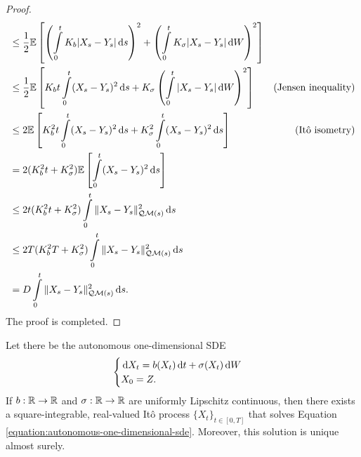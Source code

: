 \begin{proof}
\begin{align*}
     & \le \dfrac{1}{2}\mathbb{E}\left[\left(\int\limits_0^t K_b|X_s-Y_s|\,\mathrm{d} s\right)^2+\left(\int\limits_0^t K_\sigma|X_s-Y_s|\,\mathrm{d} W\right)^2\right]                         \\
     & \le \dfrac{1}{2}\mathbb{E}\left[K_b t\int\limits_0^t (X_s-Y_s)^2\,\mathrm{d} s+K_\sigma\left(\int\limits_0^t |X_s-Y_s|\,\mathrm{d} W\right)^2\right]
     & \text{(Jensen inequality)}                                                                                                                                   \\
     & \le 2\mathbb{E}\left[K_b^2 t\int\limits_0^t (X_s-Y_s)^2\,\mathrm{d} s+K_\sigma^2\int\limits_0^t (X_s-Y_s)^2\,\mathrm{d} s\right]                                & \text{(Itô isometry)} \\
     & = 2(K_b^2 t+K_\sigma^2)\mathbb{E}\left[\int\limits_0^t (X_s-Y_s)^2\,\mathrm{d} s\right]                                                                                       \\
     & \le 2t(K_b^2 t+K_\sigma^2)\int\limits_0^t \|X_s-Y_s\|^2_{\mathcal{Q}\mathcal{M}(s)}\,\mathrm{d} s                                                                                        \\
     & \le 2T(K_b^2 T+K_\sigma^2)\int\limits_0^t \|X_s-Y_s\|^2_{\mathcal{Q}\mathcal{M}(s)}\,\mathrm{d} s                                                                                        \\
     & = D\int\limits_0^t \|X_s-Y_s\|^2_{\mathcal{Q}\mathcal{M}(s)}\,\mathrm{d} s.
  \end{align*}
  The proof is completed.
\end{proof}

\begin{theorem}
  \label{theorem:existence-and-uniqueness-solution-to-sdes-in-one-dimension}
  Let there be the autonomous one-dimensional SDE
  \begin{equation}
  \label{equation:autonomous-one-dimensional-sde}
    \begin{cases}
      \,\mathrm{d} X_t = b(X_t)\,\mathrm{d} t+\sigma(X_t)\,\mathrm{d} W \\
      X_{0} = Z.
    \end{cases}
  \end{equation}
  If $b:\mathbb{R}\to\mathbb{R}$ and $\sigma:\mathbb{R}\to\mathbb{R}$ are uniformly Lipschitz continuous, then there exists a square-integrable, real-valued Itô process $\{X_t\}_{t\in[0,T]}$ that solves Equation \ref{equation:autonomous-one-dimensional-sde}. Moreover, this solution is unique almost surely.
\end{theorem}

